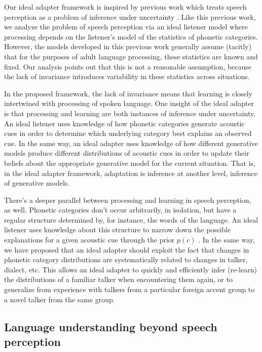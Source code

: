 Our ideal adapter framework is inspired by previous work which treats speech perception as a problem of inference under uncertainty \cite{Clayards2008,Feldman2009a,Norris2008,Sonderegger2010}.
Like this previous work, we analyze the problem of speech perception via an ideal listener model where processing depends on the listener's model of the statistics of phonetic categories.  However, the models developed in this previous work generally assume (tacitly) that for the purposes of adult language processing, these statistics are known and fixed.
Our analysis points out that this is not a reasonable assumption, because the lack of invariance introduces variability in these statistics across situations.

In the proposed framework, the lack of invariance means that learning is closely intertwined with processing of spoken language.  One insight of the ideal adapter is that processing and learning are both instances of inference under uncertainty.  An ideal listener uses knowledge of how phonetic categories generate acoustic cues in order to determine which underlying category best explains an observed cue.  In the same way, an ideal adapter uses knowledge of how different generative models produce different distributions of acoustic cues in order to update their beliefs about the appropriate generative model for the current situation.  That is, in the ideal adapter framework, adaptation is inference at another level, inference of generative models.

There's a deeper parallel between processing and learning in speech perception, as well.  Phonetic categories don't occur arbitrarily, in isolation, but have a regular structure determined by, for instance, the words of the language.  An ideal listener uses knowledge about this structure to narrow down the possible explanations for a given acoustic cue through the prior $p(c)$ \cite{Feldman2013b}.  In the same way, we have proposed that an ideal adapter should exploit the fact that changes in phonetic category distributions are systematically related to changes in talker, dialect, etc. This allows an ideal adapter to quickly and efficiently infer (re-learn) the distributions of a familiar talker when encountering them again, or to generalize from experience with talkers from a particular foreign accent group to a novel talker from the same group.

\subsection{Language understanding beyond speech perception}
\label{sec:impl-lang-proc}

